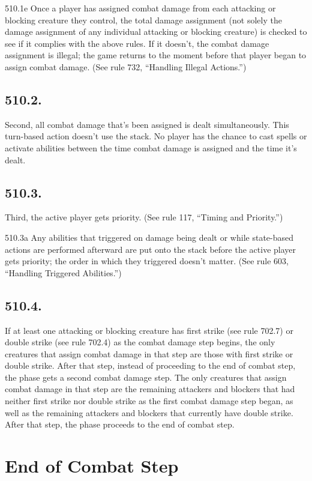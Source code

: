 510.1e Once a player has assigned combat damage from each attacking or blocking creature they control, the total damage assignment (not solely the damage assignment of any individual attacking or blocking creature) is checked to see if it complies with the above rules. If it doesn’t, the combat damage assignment is illegal; the game returns to the moment before that player began to assign combat damage. (See rule 732, “Handling Illegal Actions.”)

\subsection*{510.2.}
Second, all combat damage that’s been assigned is dealt simultaneously. This turn-based action doesn’t use the stack. No player has the chance to cast spells or activate abilities between the time combat damage is assigned and the time it’s dealt.

\subsection*{510.3.}
Third, the active player gets priority. (See rule 117, “Timing and Priority.”)

510.3a Any abilities that triggered on damage being dealt or while state-based actions are performed afterward are put onto the stack before the active player gets priority; the order in which they triggered doesn’t matter. (See rule 603, “Handling Triggered Abilities.”)

\subsection*{510.4.}
If at least one attacking or blocking creature has first strike (see rule 702.7) or double strike (see rule 702.4) as the combat damage step begins, the only creatures that assign combat damage in that step are those with first strike or double strike. After that step, instead of proceeding to the end of combat step, the phase gets a second combat damage step. The only creatures that assign combat damage in that step are the remaining attackers and blockers that had neither first strike nor double strike as the first combat damage step began, as well as the remaining attackers and blockers that currently have double strike. After that step, the phase proceeds to the end of combat step.

\section{End of Combat Step}
